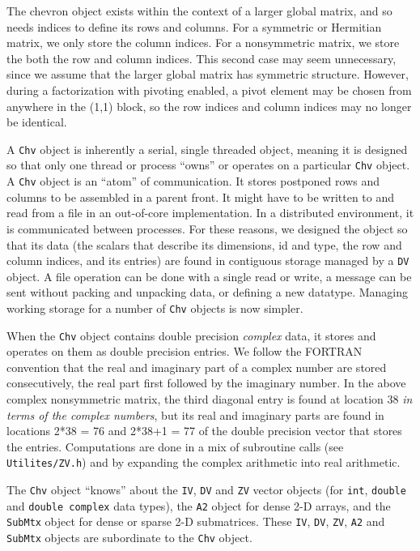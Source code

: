 \par
The chevron object exists within the context of a larger global
matrix, and so needs indices to define its rows and columns.
For a symmetric or Hermitian matrix, we only store the column
indices.
For a nonsymmetric matrix, we store the both the row and column 
indices.
This second case may seem unnecessary, since we assume that the
larger global matrix has symmetric structure.
However, during a factorization with pivoting enabled,
a pivot element may be chosen from anywhere in the (1,1) block,
so the row indices and column indices may no longer be identical.
\par
A {\tt Chv} object is inherently a serial, single threaded object,
meaning it is designed so that only one thread or process ``owns''
or operates on a particular {\tt Chv} object.
A {\tt Chv} object is an ``atom'' of communication.
It stores postponed rows and columns to be assembled in a parent
front.
It might have to be written to and read from a file in an
out-of-core implementation.
In a distributed environment, it is communicated between processes.
For these reasons, we designed the object so that its data
(the scalars that describe its dimensions, id and type,
the row and column indices, and its entries) are found in
contiguous storage managed by a {\tt DV} object.
A file operation can be done with a single read or write,
a message can be sent without packing and unpacking data,
or defining a new datatype.
Managing working storage for a number of {\tt Chv} objects
is now simpler.
\par
When the {\tt Chv} object contains double precision {\it complex} data,
it stores and operates on them as double precision entries.
We follow the FORTRAN convention that the real and imaginary part
of a complex number are stored consecutively, the real part first
followed by the imaginary number.
In the above complex nonsymmetric matrix, 
the third diagonal entry is found
at location 38 {\it in terms of the complex numbers}, but its real
and imaginary parts are found in locations 2*38 = 76 and 2*38+1 = 77
of the double precision vector that stores the entries.
Computations are done in a mix of subroutine calls
(see {\tt Utilites/ZV.h}) and by expanding the complex arithmetic
into real arithmetic.
\par
The {\tt Chv} object ``knows'' about the {\tt IV}, {\tt DV} and
{\tt ZV} vector objects (for {\tt int}, {\tt double} and
{\tt double complex} data types),
the {\tt A2} object for dense 2-D arrays,
and the {\tt SubMtx} object for dense or sparse 2-D submatrices.
These {\tt IV}, {\tt DV}, {\tt ZV}, {\tt A2} and {\tt SubMtx} objects
are subordinate to the {\tt Chv} object.
